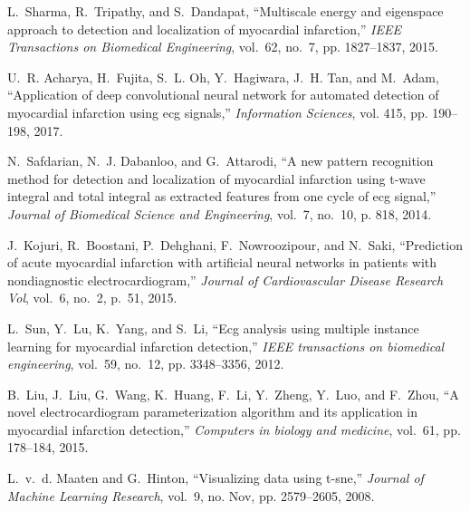 \documentclass[10pt, conference, compsocconf]{IEEEtran}
\begin{document}
\begin{thebibliography}{10}
	L.~Sharma, R.~Tripathy, and S.~Dandapat, ``Multiscale energy and eigenspace
	approach to detection and localization of myocardial infarction,'' \emph{IEEE
		Transactions on Biomedical Engineering}, vol.~62, no.~7, pp. 1827--1837,
	2015.
	
	U.~R. Acharya, H.~Fujita, S.~L. Oh, Y.~Hagiwara, J.~H. Tan, and M.~Adam,
	``Application of deep convolutional neural network for automated detection of
	myocardial infarction using ecg signals,'' \emph{Information Sciences}, vol.
	415, pp. 190--198, 2017.
	
	N.~Safdarian, N.~J. Dabanloo, and G.~Attarodi, ``A new pattern recognition
	method for detection and localization of myocardial infarction using t-wave
	integral and total integral as extracted features from one cycle of ecg
	signal,'' \emph{Journal of Biomedical Science and Engineering}, vol.~7,
	no.~10, p. 818, 2014.
	
	J.~Kojuri, R.~Boostani, P.~Dehghani, F.~Nowroozipour, and N.~Saki, ``Prediction
	of acute myocardial infarction with artificial neural networks in patients
	with nondiagnostic electrocardiogram,'' \emph{Journal of Cardiovascular
		Disease Research Vol}, vol.~6, no.~2, p.~51, 2015.
	
	L.~Sun, Y.~Lu, K.~Yang, and S.~Li, ``Ecg analysis using multiple instance
	learning for myocardial infarction detection,'' \emph{IEEE transactions on
		biomedical engineering}, vol.~59, no.~12, pp. 3348--3356, 2012.
	
	B.~Liu, J.~Liu, G.~Wang, K.~Huang, F.~Li, Y.~Zheng, Y.~Luo, and F.~Zhou, ``A
	novel electrocardiogram parameterization algorithm and its application in
	myocardial infarction detection,'' \emph{Computers in biology and medicine},
	vol.~61, pp. 178--184, 2015.
	
	L.~v.~d. Maaten and G.~Hinton, ``Visualizing data using t-sne,'' \emph{Journal
		of Machine Learning Research}, vol.~9, no. Nov, pp. 2579--2605, 2008.
	
\end{thebibliography}
\end{document}
